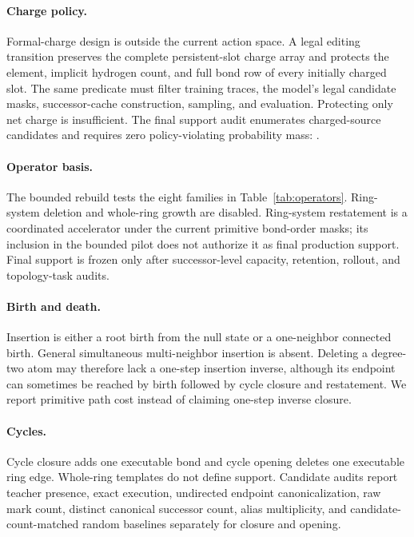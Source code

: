 \paragraph{Charge policy.}
Formal-charge design is outside the current action space.  A legal editing
transition preserves the complete persistent-slot charge array and protects
the element, implicit hydrogen count, and full bond row of every initially
charged slot.  The same predicate must filter training traces, the model's
legal candidate masks, successor-cache construction, sampling, and evaluation.
Protecting only net charge is insufficient.  The final support audit enumerates
charged-source candidates and requires zero policy-violating probability mass:
.

\paragraph{Operator basis.}
The bounded rebuild tests the eight families in
Table~\ref{tab:operators}.  Ring-system deletion and whole-ring growth are
disabled.  Ring-system restatement is a coordinated accelerator under the
current primitive bond-order masks; its inclusion in the bounded pilot does
not authorize it as final production support.  Final support is frozen only
after successor-level capacity, retention, rollout, and topology-task audits.

\paragraph{Birth and death.}
Insertion is either a root birth from the null state or a one-neighbor
connected birth.  General simultaneous multi-neighbor insertion is absent.
Deleting a degree-two atom may therefore lack a one-step insertion inverse,
although its endpoint can sometimes be reached by birth followed by cycle
closure and restatement.  We report primitive path cost instead of claiming
one-step inverse closure.

\paragraph{Cycles.}
Cycle closure adds one executable bond and cycle opening deletes one executable
ring edge.  Whole-ring templates do not define support.  Candidate audits
report teacher presence, exact execution, undirected endpoint
canonicalization, raw mark count, distinct canonical successor count, alias
multiplicity, and candidate-count-matched random baselines separately for
closure and opening.

